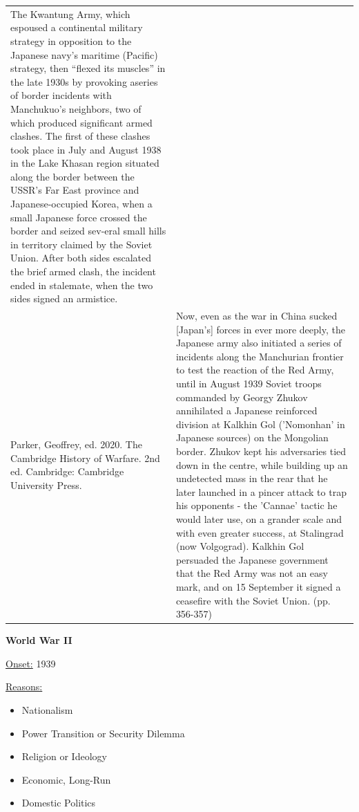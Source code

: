 {\begin{longtable}{p{}p{}}
The Kwantung Army, which espoused a continental military strategy in opposition to the Japanese navy's maritime (Pacific) strategy, then “flexed its muscles” in the late 1930s by provoking aseries of border incidents with Manchukuo's neighbors, two of which produced significant armed clashes. The first of these clashes took place in July and August 1938 in the Lake Khasan region situated along the border between the USSR's Far East province and Japanese-occupied Korea, when a small Japanese force crossed the border and seized sev-eral small hills in territory claimed by the Soviet Union. After both sides escalated the brief armed clash, the incident ended in stalemate, when the two sides signed an armistice.
\\
Parker, Geoffrey, ed. 2020. The Cambridge History of Warfare. 2nd ed. Cambridge: Cambridge University Press. & Now, even as the war in China sucked [Japan's] forces in ever more deeply, the Japanese army also initiated a series of incidents along the Manchurian frontier to test the reaction of the Red Army, until in August 1939 Soviet troops commanded by Georgy Zhukov annihilated a Japanese reinforced division at Kalkhin Gol ('Nomonhan' in Japanese sources) on the Mongolian border. Zhukov kept his adversaries tied down in the centre, while building up an undetected mass in the rear that he later launched in a pincer attack to trap his opponents - the 'Cannae' tactic he would later use, on a grander scale and with even greater success, at Stalingrad (now Volgograd). Kalkhin Gol persuaded the Japanese government that the Red Army was not an easy mark, and on 15 September it signed a ceasefire with the Soviet Union. (pp. 356-357)
\\
\end{longtable}}
\clearpage
         \textbf{World War II} 

          \underline{Onset:} 1939         

\underline{Reasons:}
\begin{itemize}
\item Nationalism
\item Power Transition or Security Dilemma
\item Religion or Ideology
\item Economic, Long-Run
\item Domestic Politics
\end{itemize}

